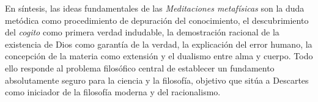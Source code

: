 \documentclass[10pt]{article}
\begin{document}
En síntesis, las ideas fundamentales de las \textit{Meditaciones metafísicas} son la duda metódica como procedimiento de depuración del conocimiento, el descubrimiento del \textit{cogito} como primera
verdad indudable, la demostración racional de la existencia de Dios como garantía de la verdad, la explicación del error humano, la concepción de la materia como extensión y el dualismo entre alma y cuerpo.
Todo ello responde al problema filosófico central de establecer un fundamento absolutamente seguro para la ciencia y la filosofía, objetivo que sitúa a Descartes como iniciador de la filosofía moderna y del
racionalismo.

%
%
%
%
\end{document}
